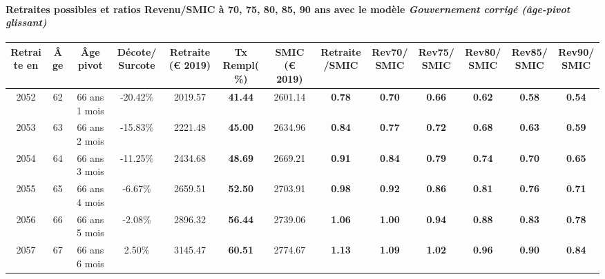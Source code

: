 \paragraph{Retraites possibles et ratios Revenu/SMIC à 70, 75, 80, 85, 90 ans avec le modèle \emph{Gouvernement corrigé (âge-pivot glissant)}}  
 
{ \scriptsize \begin{center} 
\begin{tabular}[htb]{|c|c||c|c||c|c||c||c|c|c|c|c|c|} 
\hline 
 Retraite en &  Âge &  Âge pivot &  Décote/Surcote &  Retraite (\euro{} 2019) &  Tx Rempl(\%) &  SMIC (\euro{} 2019) &  Retraite/SMIC &  Rev70/SMIC &  Rev75/SMIC &  Rev80/SMIC &  Rev85/SMIC &  Rev90/SMIC \\ 
\hline \hline 
 2052 &  62 &  66 ans 1 mois &  -20.42\% &  2019.57 &  {\bf 41.44} &  2601.14 &  {\bf {\color{red} 0.78}} &  {\bf {\color{red} 0.70}} &  {\bf {\color{red} 0.66}} &  {\bf {\color{red} 0.62}} &  {\bf {\color{red} 0.58}} &  {\bf {\color{red} 0.54}} \\ 
\hline 
 2053 &  63 &  66 ans 2 mois &  -15.83\% &  2221.48 &  {\bf 45.00} &  2634.96 &  {\bf {\color{red} 0.84}} &  {\bf {\color{red} 0.77}} &  {\bf {\color{red} 0.72}} &  {\bf {\color{red} 0.68}} &  {\bf {\color{red} 0.63}} &  {\bf {\color{red} 0.59}} \\ 
\hline 
 2054 &  64 &  66 ans 3 mois &  -11.25\% &  2434.68 &  {\bf 48.69} &  2669.21 &  {\bf {\color{red} 0.91}} &  {\bf {\color{red} 0.84}} &  {\bf {\color{red} 0.79}} &  {\bf {\color{red} 0.74}} &  {\bf {\color{red} 0.70}} &  {\bf {\color{red} 0.65}} \\ 
\hline 
 2055 &  65 &  66 ans 4 mois &  -6.67\% &  2659.51 &  {\bf 52.50} &  2703.91 &  {\bf {\color{red} 0.98}} &  {\bf {\color{red} 0.92}} &  {\bf {\color{red} 0.86}} &  {\bf {\color{red} 0.81}} &  {\bf {\color{red} 0.76}} &  {\bf {\color{red} 0.71}} \\ 
\hline 
 2056 &  66 &  66 ans 5 mois &  -2.08\% &  2896.32 &  {\bf 56.44} &  2739.06 &  {\bf 1.06} &  {\bf 1.00} &  {\bf {\color{red} 0.94}} &  {\bf {\color{red} 0.88}} &  {\bf {\color{red} 0.83}} &  {\bf {\color{red} 0.78}} \\ 
\hline 
 2057 &  67 &  66 ans 6 mois &  2.50\% &  3145.47 &  {\bf 60.51} &  2774.67 &  {\bf 1.13} &  {\bf 1.09} &  {\bf 1.02} &  {\bf {\color{red} 0.96}} &  {\bf {\color{red} 0.90}} &  {\bf {\color{red} 0.84}} \\ 
\hline 
\hline 
\end{tabular} 
\end{center} } 
